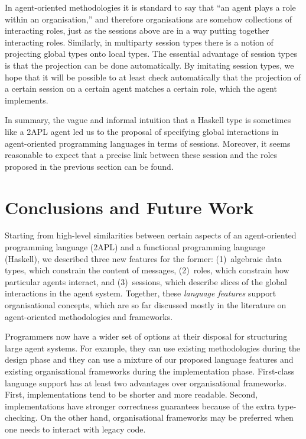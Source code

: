 \documentclass[conference,compsoc]{IEEEtran} %
\begin{document}
In agent-oriented methodologies it is standard to say that ``an agent plays
a role within an organisation,'' and therefore organisations are somehow
collections of interacting roles, just as the sessions above are in a way
putting together interacting roles. Similarly, in multiparty session types
there is a notion of projecting global types onto local types. The
essential advantage of session types is that the projection can be done
automatically. By imitating session types, we hope that it will be possible
to at least check automatically that the projection of a certain session on
a certain agent matches a certain role, which the agent implements.

In summary, the vague and informal intuition that a Haskell type is
sometimes like a 2APL agent led us to the proposal of specifying global
interactions in agent-oriented programming languages in terms of sessions.
Moreover, it seems reasonable to expect that a precise link between these
session and the roles proposed in the previous section can be found.

\section{Conclusions and Future Work} %

Starting from high-level similarities between certain aspects of an
agent-oriented programming language (2APL) and a functional programming
language (Haskell), we described three new features for the former:
(1)~algebraic data types, which constrain the content of messages,
(2)~roles, which constrain how particular agents interact, and
(3)~sessions, which describe slices of the global interactions in the agent
system. Together, these \emph{language features} support organisational
concepts, which are so far discussed mostly in the literature on
agent-oriented methodologies and frameworks.

Programmers now have a wider set of options at their disposal for
structuring large agent systems. For example, they can use existing
methodologies during the design phase and they can use a mixture of our
proposed language features and existing organisational frameworks during
the implementation phase. First-class language support has at least two
advantages over organisational frameworks. First, implementations tend to
be shorter and more readable. Second, implementations have stronger
correctness guarantees because of the extra type-checking. On the other
hand, organisational frameworks may be preferred when one needs to interact
with legacy code.
\end{document}

